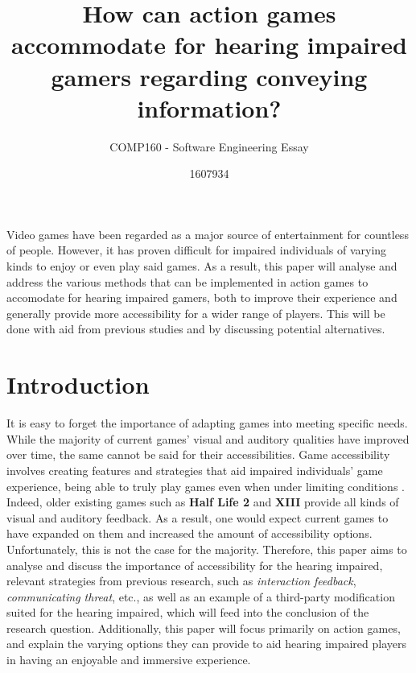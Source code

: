 \documentclass{scrartcl}
\title{How can action games accommodate for hearing impaired gamers regarding conveying information?}
\subtitle{COMP160 - Software Engineering Essay}
\author{1607934}
\begin{document}
\maketitle

\abstract
Video games have been regarded as a major source of entertainment for countless of people. However, it has proven difficult for impaired individuals of varying kinds to enjoy or even play said games. As a result, this paper will analyse and address the various methods that can be implemented in action games to accomodate for hearing impaired gamers, both to improve their experience and generally provide more accessibility for a wider range of players. This will be done with aid from previous studies and by discussing potential alternatives.

\section{Introduction}
It is easy to forget the importance of adapting games into meeting specific needs. While the majority of current games' visual and auditory qualities have improved over time, the same cannot be said for their accessibilities. \cite{McPheron} Game accessibility involves creating features and strategies that aid impaired individuals' game experience, being able to truly play games even when under limiting conditions \cite{Bierre}. Indeed, older existing games such as \textbf{Half Life 2} and \textbf{XIII} provide all kinds of visual and auditory feedback. \cite{Denise} As a result, one would expect current games to have expanded on them and increased the amount of accessibility options. Unfortunately, this is not the case for the majority. Therefore, this paper aims to analyse and discuss the importance of accessibility for the hearing impaired, relevant strategies from previous research, such as \textit{interaction feedback}, \textit{communicating threat}, etc., as well as an example of a third-party modification suited for the hearing impaired, which will feed into the conclusion of the research question. \cite{Denise} \cite{Arch} Additionally, this paper will focus primarily on action games, and explain the varying options they can provide to aid hearing impaired players in having an enjoyable and immersive experience.
\end{document}
